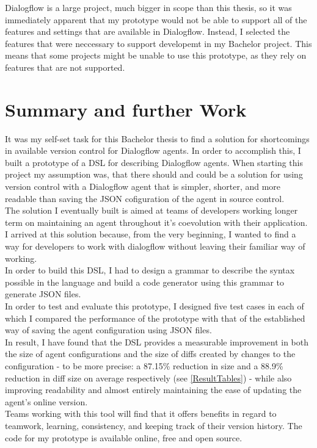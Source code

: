 Dialogflow is a large project, much bigger in scope than this thesis, so it was immediately apparent that my prototype would not be able to support all of the features and settings that are available in Dialogflow.
Instead, I selected the features that were neccessary to support developemt in my Bachelor project.
This means that some projects might be unable to use this prototype, as they rely on features that are not supported.


\chapter{Summary and further Work}

It was my self-set task for this Bachelor thesis to find a solution for shortcomings in available version control for Dialogflow agents. In order to accomplish this, I built a prototype of a DSL for describing Dialogflow agents.
When starting this project my assumption was, that there should and could be a solution for using version control with a Dialogflow agent that is simpler, shorter, and more readable than saving the JSON cofiguration of the agent in source control.\\
The solution I eventually built is aimed at teams of developers working longer term on maintaining an agent throughout it's coevolution with their application.
I arrived at this solution because, from the very beginning, I wanted to find a way for developers to work with dialogflow without leaving their familiar way of working.\\
In order to build this DSL, I had to design a grammar to describe the syntax possible in the language and build a code generator using this grammar to generate JSON files.\\
In order to test and evaluate this prototype, I designed five test cases in each of which I compared the performance of the prototype with that of the established way of saving the agent configuration using JSON files.\\
In result, I have found that the DSL provides a measurable improvement in both the size of agent configurations and the size of diffs created by changes to the configuration - to be more precise: a 87.15\% reduction in size and a 88.9\% reduction in diff size on average respectively (see \autoref{ResultTables}) - while also improving readability and almost entirely maintaining the ease of updating the agent's online version.\\
Teams working with this tool will find that it offers benefits in regard to teamwork, learning, consistency, and keeping track of their version history.
The code for my prototype is available online, free and open source.

